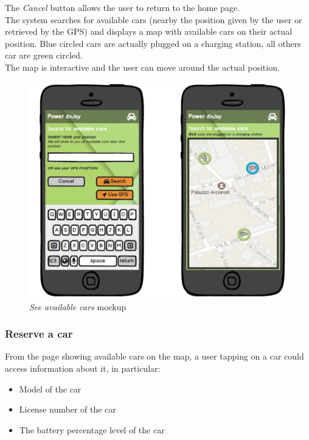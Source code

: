 The \emph{Cancel} button allows the user to return to the home page. \\

The system searches for available cars (nearby the position given by the user or retrieved by the GPS) and displays a map with available cars on their actual position. Blue circled cars are actually plugged on a charging station, all others car are green circled.\\

The map is interactive and the user can move around the actual position. \\

	\begin{figure}[h]
			\centering
			\includegraphics[width=0.9\linewidth]{mockups/findCar}
			\caption{
				\label{fig:searchCar} 
				\emph{See available cars} mockup
			}
		\end{figure}

\subsubsection{Reserve a car}

From the page showing available cars on the map, a user tapping on a car could access information about it, in particular:
\begin{itemize}
	\item Model of the car
	\item License number of the car
	\item The battery percentage level of the car
\end{itemize}


